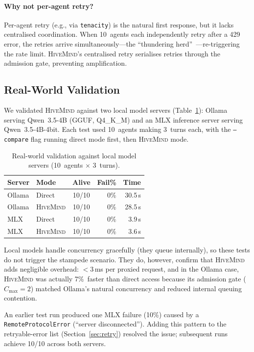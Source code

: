 \documentclass[11pt,twocolumn]{article}
\newcommand{\hm}{\textsc{HiveMind}}
\begin{document}
\paragraph{Why not per-agent retry?}
Per-agent retry (e.g., via \texttt{tenacity}) is the natural
first response, but it lacks centralised coordination.  When
10~agents each independently retry after a 429 error, the
retries arrive simultaneously---the ``thundering
herd''~\cite{dean2013tail}---re-triggering the rate limit.
\hm{}'s centralised retry serialises retries through the
admission gate, preventing amplification.

\subsection{Real-World Validation}

We validated \hm{} against two local model servers
(Table~\ref{tab:realworld}): Ollama~\cite{ollama} serving
Qwen~3.5-4B (GGUF, Q4\_K\_M) and an MLX inference server
serving Qwen~3.5-4B-4bit.  Each test used 10~agents making
3~turns each, with the \texttt{--compare} flag running direct
mode first, then \hm{} mode.

\begin{table}[!htb]
\centering
\small
\caption{Real-world validation against local model servers
(10~agents $\times$ 3~turns).}
\label{tab:realworld}
\begin{tabular}{@{}llcrr@{}}
\toprule
Server & Mode & Alive & Fail\% & Time \\
\midrule
Ollama & Direct  & 10/10 & 0\% & 30.5\,s \\
Ollama & \hm{}   & 10/10 & 0\% & 28.5\,s \\
\midrule
MLX    & Direct  & 10/10 & 0\% & 3.9\,s \\
MLX    & \hm{}   & 10/10 & 0\% & 3.6\,s \\
\bottomrule
\end{tabular}
\end{table}

Local models handle concurrency gracefully (they queue
internally), so these tests do not trigger the stampede scenario.
They do, however, confirm that \hm{} adds negligible overhead:
$<$3\,ms per proxied request, and in the Ollama case, \hm{} was
actually 7\%~faster than direct access because its admission gate
($C_{\max} = 2$) matched Ollama's natural concurrency and reduced
internal queuing contention.

An earlier test run produced one MLX failure (10\%) caused by a
\texttt{RemoteProtocolError} (``server disconnected'').  Adding
this pattern to the retryable-error list
(Section~\ref{sec:retry}) resolved the issue; subsequent runs
achieve 10/10 across both servers.
\end{document}
